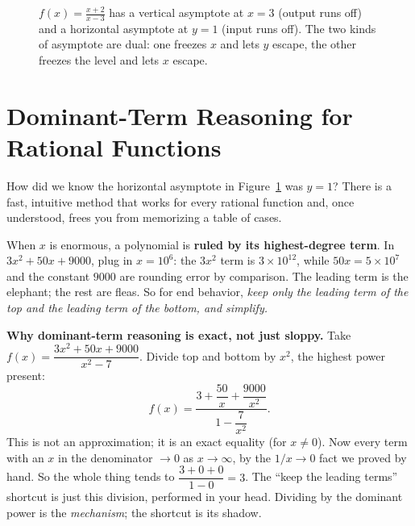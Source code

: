 \begin{figure}[H]
\centering
{}
\caption{$f(x)=\frac{x+2}{x-3}$ has a vertical asymptote at $x=3$ (output runs
off) and a horizontal asymptote at $y=1$ (input runs off). The two kinds of
asymptote are dual: one freezes $x$ and lets $y$ escape, the other freezes the
level and lets $x$ escape.}
\label{ch09:fig-rational}
\end{figure}

\section{Dominant-Term Reasoning for Rational Functions}
\label{ch09:dominant}

How did we know the horizontal asymptote in Figure~\ref{ch09:fig-rational} was
$y=1$? There is a fast, intuitive method that works for every rational function
and, once understood, frees you from memorizing a table of cases.

\begin{intuitionbox}
When $x$ is enormous, a polynomial is \textbf{ruled by its highest-degree term}.
In $3x^2 + 50x + 9000$, plug in $x=10^6$: the $3x^2$ term is $3\times 10^{12}$,
while $50x = 5\times 10^7$ and the constant $9000$ are rounding error by
comparison. The leading term is the elephant; the rest are fleas. So for end
behavior, \emph{keep only the leading term of the top and the leading term of
the bottom, and simplify.}
\end{intuitionbox}

\begin{whybox}
\textbf{Why dominant-term reasoning is exact, not just sloppy.} Take
$f(x)=\dfrac{3x^2+50x+9000}{x^2-7}$. Divide top and bottom by $x^2$, the highest
power present:
\[
  f(x) = \frac{3 + \dfrac{50}{x} + \dfrac{9000}{x^2}}
              {1 - \dfrac{7}{x^2}} .
\]
This is not an approximation; it is an exact equality (for $x\ne 0$). Now every
term with an $x$ in the denominator $\to 0$ as $x\to\infty$, by the
$1/x\to 0$ fact we proved by hand. So the whole thing tends to
$\dfrac{3+0+0}{1-0} = 3$. The ``keep the leading terms'' shortcut is just this
division, performed in your head. Dividing by the dominant power is the
\emph{mechanism}; the shortcut is its shadow.
\end{whybox}

